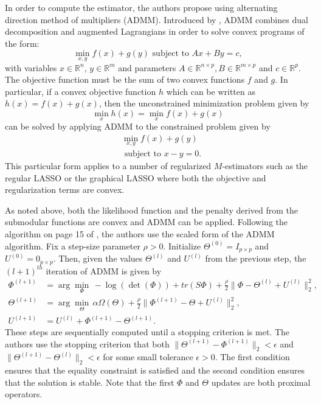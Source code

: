 \documentclass{uwstat572}
\theoremstyle{remark}
\theoremstyle{definition}
\begin{document}
In order to compute the estimator, the authors propose using alternating direction method of multipliers (ADMM).  Introduced by \cite{Boyd2011}, ADMM combines dual decomposition and augmented Lagrangians in order to solve convex programs of the form:
\begin{equation*}
    \min_{x,y} f(x) + g(y) {\text{  subject to }} Ax + By = c,
\end{equation*}
with variables $x \in \mathbb{R}^n, \, y \in \mathbb{R}^m$ and parameters $A \in \mathbb{R}^{n \times p}, B \in \mathbb{R}^{m \times p}$ and $c \in \mathbb{R}^p$.  The objective function must be the sum of two convex functions $f$ and $g$.  In particular, if a convex objective function $h$ which can be written as $h(x) = f(x) + g(x)$, then the unconstrained minimization problem given by
\begin{equation*}
\min_{x} h(x) = \min_{x} f(x) + g(x)
\end{equation*}
can be solved by applying ADMM to the constrained problem given by
\begin{align*}
& \min_{x,y} f(x) + g(y) 
\\
& {\text{ subject to }} x - y = 0.
\end{align*}
This particular form applies to a number of regularized $M$-estimators such as the regular LASSO or the graphical LASSO where both the objective and regularization terms are convex.  

As noted above, both the likelihood function and the penalty derived from the submodular functions are convex and ADMM can be applied. Following the algorithm on page 15 of \citep{Boyd2011}, the authors use the scaled form of the ADMM algorithm.  Fix a step-size parameter $\rho > 0$.  Initialize $\Theta^{(0)} = I_{p\times p}$ and $U^{(0)} = 0_{p \times p}$.  Then, given the values $\Theta^{(l)}$ and $U^{(l)}$ from the previous step, the $(l+1)^{th}$ iteration of ADMM is given by
\begin{align}
\Phi^{(l+1)} & =  \arg\min_{\Phi} \, -\log(\det(\Phi)) + tr(S \Phi) + \frac{\rho}{2}\| \Phi - \Theta^{(l)} + U^{(l)}\|_2^2,
\label{likprox}
\\
\Theta^{(l+1)} & = \arg \min_{\Theta} \, \alpha \Omega(\Theta) + \frac{\rho}{2} \| \Phi^{(l+1)} - \Theta + U^{(l)} \|_2^2,
\label{omegaprox}
\\
U^{(l+1)} & = U^{(l)} + \Phi^{(l+1)} - \Theta^{(l+1)}.
\label{resid}
\end{align}
These steps are sequentially computed until a stopping criterion is met.  The authors use the stopping criterion that both $\|\Theta^{(l+1)} - \Phi^{(l+1)}\|_2 < \epsilon$ and $\|\Theta^{(l+1)} - \Theta^{(l)}\|_2 < \epsilon$ for some small tolerance $\epsilon > 0$.  The first condition ensures that the equality constraint is satisfied and the second condition ensures that the solution is stable.  Note that the first $\Phi$ and $\Theta$ updates are both proximal operators. 
\end{document}
